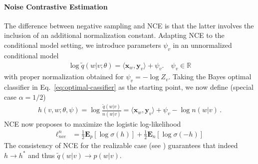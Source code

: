 \documentclass{article}
\renewcommand{\Re}{{\mathbb R}}
\newcommand{\E}{{\mathbf E}}
\newcommand{\x}{{\mathbf x}}
\newcommand{\y}{{\mathbf y}}
\begin{document}
\paragraph{Noise Contrastive Estimation} 

The difference between negative sampling and NCE is that the latter involves the inclusion of an additional normalization constant. Adapting NCE to the conditional model setting, we introduce  parameters $\psi_v$ in  an unnormalized conditional model
\begin{align}
\log \tilde q(w|v; \theta)= \langle \x_w, \y_v \rangle + \psi_v. \quad \psi_v \in \Re
\end{align}
with proper normalization obtained for $\psi_v = -\log Z_v$. Taking the Bayes optimal classifier in Eq.~\eqref{eq:optimal-cassifier} as the starting point, we now define (special case $\alpha = 1/2$)
\begin{align}
h(v,w; \theta, \psi) = \log \frac{\tilde q(w|v)}{n(w|v)} =\langle \x_w, \y_v\rangle + \psi_v - \log n(w|v)\,.
\end{align}
NCE now proposes to maximize the logistic log-likelihood
\begin{align}
\ell_{nce}^n & =   \tfrac 12 \E_p[ \log \sigma(h)] + \tfrac 12 \E_{n} \left[ \log \sigma(-h) \right]
\end{align}
The consistency of NCE for the realizable case (see \cite[Theorem 2]{gutmann2012noise}) guarantees that indeed $h \to h^*$ and thus $\tilde q(w|v) \to p(w|v)$. 
\end{document}
